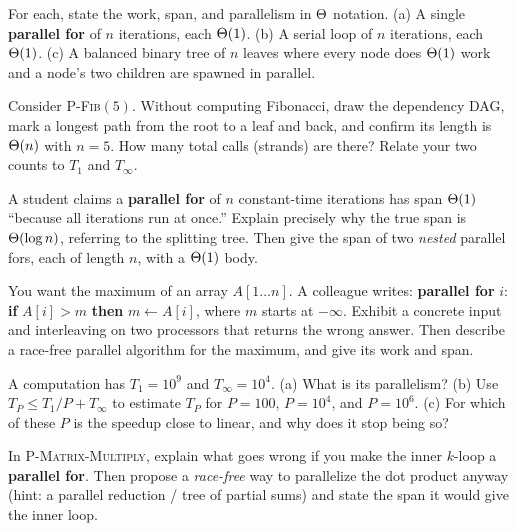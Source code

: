 \begin{exercise}
For each, state the work, span, and parallelism in $\Theta$ notation.
(a) A single \textbf{parallel for} of $n$ iterations, each $\Theta(1)$.
(b) A serial loop of $n$ iterations, each $\Theta(1)$.
(c) A balanced binary tree of $n$ leaves where every node does $\Theta(1)$ work and a
node's two children are spawned in parallel.
\end{exercise}

\begin{exercise}
Consider \textsc{P-Fib}$(5)$. Without computing Fibonacci, draw the dependency
DAG, mark a longest path from the root to a leaf and back, and confirm its length
is $\Theta(n)$ with $n=5$. How many total calls (strands) are there? Relate your two
counts to $T_1$ and $T_\infty$.
\end{exercise}

\begin{exercise}
A student claims a \textbf{parallel for} of $n$ constant-time iterations has span
$\Theta(1)$ ``because all iterations run at once.'' Explain precisely why the true
span is $\Theta(\log n)$, referring to the splitting tree. Then give the span of two
\emph{nested} parallel fors, each of length $n$, with a $\Theta(1)$ body.
\end{exercise}

\begin{exercise}
You want the maximum of an array $A[1\ldots n]$. A colleague writes:
\textbf{parallel for} $i$: \textbf{if} $A[i] > m$ \textbf{then} $m \gets A[i]$,
where $m$ starts at $-\infty$. Exhibit a concrete input and interleaving on two
processors that returns the wrong answer. Then describe a race-free parallel
algorithm for the maximum, and give its work and span.
\end{exercise}

\begin{exercise}
A computation has $T_1 = 10^9$ and $T_\infty = 10^4$. (a) What is its parallelism?
(b) Use $T_P \le T_1/P + T_\infty$ to estimate $T_P$ for $P = 100$, $P = 10^4$, and
$P = 10^6$. (c) For which of these $P$ is the speedup close to linear, and why does
it stop being so?
\end{exercise}

\begin{exercise}
In \textsc{P-Matrix-Multiply}, explain what goes wrong if you make the inner
$k$-loop a \textbf{parallel for}. Then propose a \emph{race-free} way to
parallelize the dot product anyway (hint: a parallel reduction / tree of partial
sums) and state the span it would give the inner loop.
\end{exercise}

